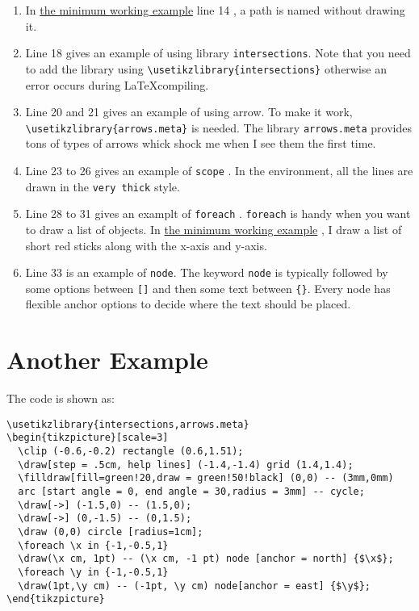 \documentclass[koma,a4paper,utopia,12pt,listings-color,microtype,paralist,colorlinks,urlcolor=red]{org-article}
\begin{document}
\begin{enumerate}
\item In \hyperref[a-minimum-working-example]{the minimum working example} line 14 , a path is named  without drawing
it.
\item Line 18 gives an example of using library \texttt{intersections}. Note
that you need to add the library using \texttt{\textbackslash{}usetikzlibrary\{intersections\}}
otherwise an error occurs during \LaTeX compiling.
\item Line 20 and 21 gives an example of using arrow. To make it work,
\texttt{\textbackslash{}usetikzlibrary\{arrows.meta\}} is needed. The library \texttt{arrows.meta} provides tons
of types of arrows whick shock me when I see them the first time.
\item Line 23 to 26 gives an example of \texttt{scope} . In the environment, all
the lines are drawn in the \texttt{very thick} style.
\item Line 28 to 31 gives an examplt of \texttt{foreach} . \texttt{foreach} is handy
when you want to draw a list of objects. In \hyperref[a-minimum-working-example]{the minimum working example} , I
draw a list of short red sticks along with the x-axis and y-axis.
\item Line 33 is an example of \texttt{node}. The keyword \texttt{node} is typically followed by
some options between \texttt{[]} and then some text between \texttt{\{\}}. Every node has flexible
anchor options to decide where the text should be placed.
\end{enumerate}
\section{Another Example}
\label{sec:org9260ef3}


The code is shown as:
\begin{lstlisting}
\usetikzlibrary{intersections,arrows.meta}
\begin{tikzpicture}[scale=3]
  \clip (-0.6,-0.2) rectangle (0.6,1.51);
  \draw[step = .5cm, help lines] (-1.4,-1.4) grid (1.4,1.4);
  \filldraw[fill=green!20,draw = green!50!black] (0,0) -- (3mm,0mm)
  arc [start angle = 0, end angle = 30,radius = 3mm] -- cycle;
  \draw[->] (-1.5,0) -- (1.5,0);
  \draw[->] (0,-1.5) -- (0,1.5);
  \draw (0,0) circle [radius=1cm];
  \foreach \x in {-1,-0.5,1}
  \draw(\x cm, 1pt) -- (\x cm, -1 pt) node [anchor = north] {$\x$};
  \foreach \y in {-1,-0.5,1}
  \draw(1pt,\y cm) -- (-1pt, \y cm) node[anchor = east] {$\y$};
\end{tikzpicture}
\end{lstlisting}
\end{document}
